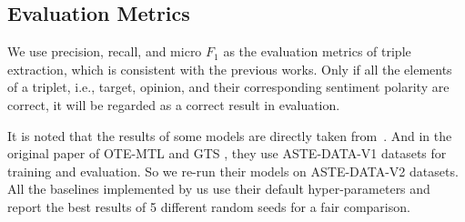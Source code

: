 \documentclass[11pt]{article}
\begin{document}
\begin{table*}[t]
    \centering
    \caption{Results of ablation study, and \textit{rm.} in this table means remove. The settings of all experiments are consistent with the main experiment. }
    \label{tab:analysis_results}
\end{table*} \subsection{Evaluation Metrics}
We use precision, recall, and micro $F_1$ as the evaluation metrics of triple extraction, which is consistent with the previous works. Only if all the elements of a triplet, i.e., target, opinion, and their corresponding sentiment polarity are correct, it will be regarded as a correct result in evaluation.

It is noted that the results of some models are directly taken from~\cite{xu2020position}.
And in the original paper of OTE-MTL \cite{zhang2020multi} and GTS  \cite{wu-etal-2020-grid}, they use ASTE-DATA-V1 datasets for training and evaluation. So we re-run their models on ASTE-DATA-V2 datasets. All the baselines implemented by us use their default hyper-parameters and report the best results of 5 different random seeds for a fair comparison. 
\end{document}
